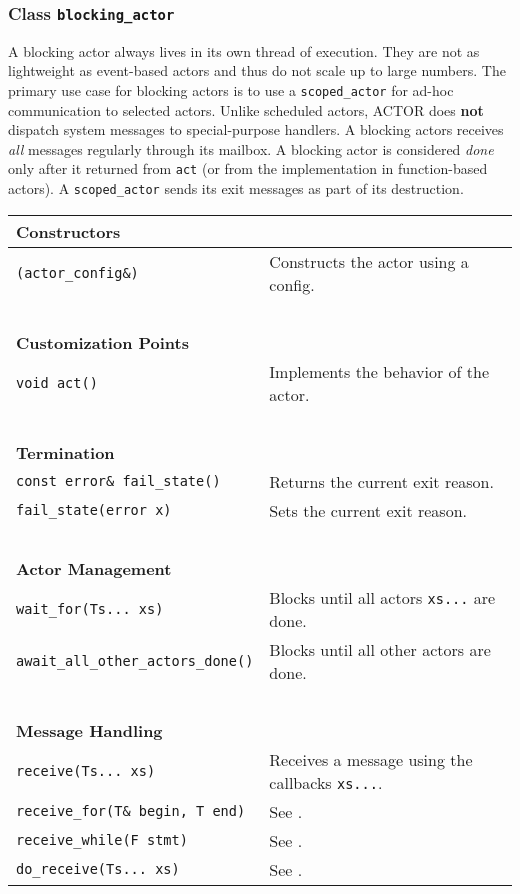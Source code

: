 \clearpage
\subsubsection{Class \lstinline^blocking_actor^}

A blocking actor always lives in its own thread of execution. They are not as
lightweight as event-based actors and thus do not scale up to large numbers.
The primary use case for blocking actors is to use a \lstinline^scoped_actor^
for ad-hoc communication to selected actors. Unlike scheduled actors, ACTOR does
\textbf{not} dispatch system messages to special-purpose handlers. A blocking
actors receives \emph{all} messages regularly through its mailbox. A blocking
actor is considered \emph{done} only after it returned from \lstinline^act^ (or
from the implementation in function-based actors). A \lstinline^scoped_actor^
sends its exit messages as part of its destruction.

\begin{center}
\begin{tabular}{ll}
  \textbf{Constructors} & ~ \\
  \hline
  \lstinline^(actor_config&)^ & Constructs the actor using a config. \\
  \hline
  ~ & ~ \\ \textbf{Customization Points} & ~ \\
  \hline
  \lstinline^void act()^ & Implements the behavior of the actor. \\
  \hline
  ~ & ~ \\ \textbf{Termination} & ~ \\
  \hline
  \lstinline^const error& fail_state()^ & Returns the current exit reason. \\
  \hline
  \lstinline^fail_state(error x)^ & Sets the current exit reason. \\
  \hline
  ~ & ~ \\ \textbf{Actor Management} & ~ \\
  \hline
  \lstinline^wait_for(Ts... xs)^ & Blocks until all actors \lstinline^xs...^ are done. \\
  \hline
  \lstinline^await_all_other_actors_done()^ & Blocks until all other actors are done. \\
  \hline
  ~ & ~ \\ \textbf{Message Handling} & ~ \\
  \hline
  \lstinline^receive(Ts... xs)^ & Receives a message using the callbacks \lstinline^xs...^. \\
  \hline
  \lstinline^receive_for(T& begin, T end)^ & See . \\
  \hline
  \lstinline^receive_while(F stmt)^ & See . \\
  \hline
  \lstinline^do_receive(Ts... xs)^ & See . \\
  \hline
\end{tabular}
\end{center}

